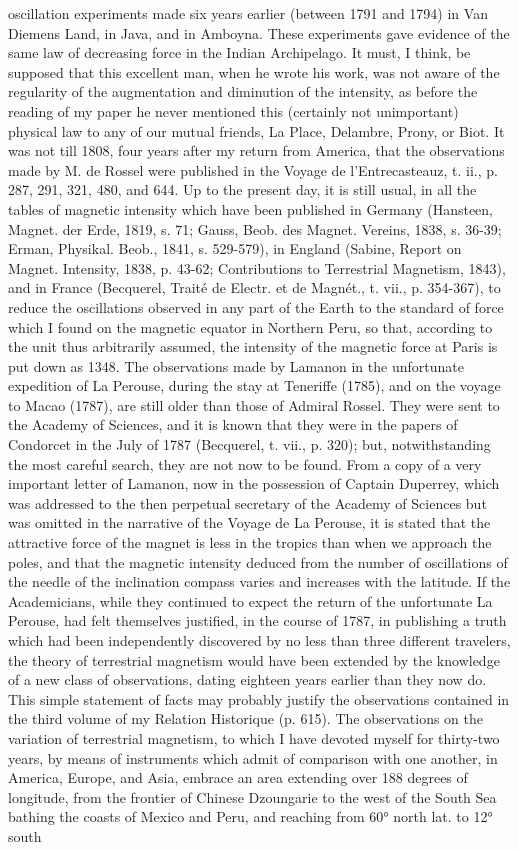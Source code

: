 oscillation experiments made six years earlier (between 1791 and 1794) in Van Diemens Land, in Java, and in Amboyna. These experiments gave evidence of the same law of decreasing force in the Indian Archipelago. It must, I think, be supposed that this excellent man, when he wrote his work, was not aware of the regularity of the augmentation and diminution of the intensity, as before the reading of my paper he never mentioned this (certainly not unimportant) physical law to any of our mutual friends, La Place, Delambre, Prony, or Biot. It was not till 1808, four years after my return from America, that the observations made by M. de Rossel were published in the Voyage de l'Entrecasteauz, t. ii., p. 287, 291, 321, 480, and 644. Up to the present day, it is still usual, in all the tables of magnetic intensity which have been published in Germany (Hansteen, Magnet. der Erde, 1819, s. 71; Gauss, Beob. des Magnet. Vereins, 1838, s. 36-39; Erman, Physikal. Beob., 1841, s. 529-579), in England (Sabine, Report on Magnet. Intensity, 1838, p. 43-62; Contributions to Terrestrial Magnetism, 1843), and in France (Becquerel, Traité de Electr. et de Magnét., t. vii., p. 354-367), to reduce the oscillations observed in any part of the Earth to the standard of force which I found on the magnetic equator in Northern Peru, so that, according to the unit thus arbitrarily assumed, the intensity of the magnetic force at Paris is put down as 1348. The observations made by Lamanon in the unfortunate expedition of La Perouse, during the stay at Teneriffe (1785), and on the voyage to Macao (1787), are still older than those of Admiral Rossel. They were sent to the Academy of Sciences, and it is known that they were in the papers of Condorcet in the July of 1787 (Becquerel, t. vii., p. 320); but, notwithstanding the most careful search, they are not now to be found. From a copy of a very important letter of Lamanon, now in the possession of Captain Duperrey, which was addressed to the then perpetual secretary of the Academy of Sciences but was omitted in the narrative of the Voyage de La Perouse, it is stated that the attractive force of the magnet is less in the tropics than when we approach the poles, and that the magnetic intensity deduced from the number of oscillations of the needle of the inclination compass varies and increases with the latitude. If the Academicians, while they continued to expect the return of the unfortunate La Perouse, had felt themselves justified, in the course of 1787, in publishing a truth which had been independently discovered by no less than three different travelers, the theory of terrestrial magnetism would have been extended by the knowledge of a new class of observations, dating eighteen years earlier than they now do. This simple statement of facts may probably justify the observations contained in the third volume of my Relation Historique (p. 615). The observations on the variation of terrestrial magnetism, to which I have devoted myself for thirty-two years, by means of instruments which admit of comparison with one another, in America, Europe, and Asia, embrace an area extending over 188 degrees of longitude, from the frontier of Chinese Dzoungarie to the west of the South Sea bathing the coasts of Mexico and Peru, and reaching from 60° north lat. to 12° south 